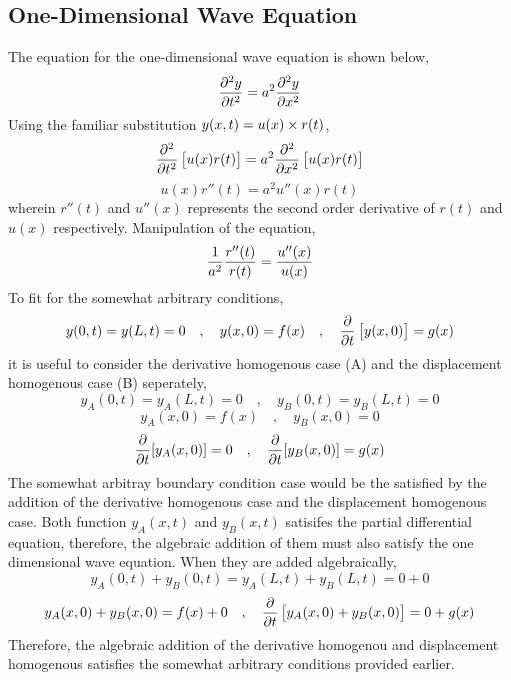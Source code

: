 \documentclass[class=report, 12pt, crop=false]{standalone}
\begin{document}
\begin{center}
\chapter{One-Dimensional Wave Equation}
\begin{comment} 
Physics Archives
\end{comment}
The equation for the one-dimensional wave equation is shown below,
$$\frac{\partial^2 y}{\partial t^2} = a^2\frac{\partial^2 y}{\partial x^2}$$ 
Using the familiar substitution $\displaystyle{y(x,t) = u(x)\times r(t)}$,
$$\frac{\partial^2}{\partial t^2}\left[u(x)r(t)\right] = a^2\frac{\partial^2}{\partial x^2}\left[u(x)r(t)\right]$$
$$u(x)r''(t) = a^2u''(x)r(t)$$ 
wherein $r''(t)$ and $u''(x)$ represents the second order derivative of $r(t)$ and $u(x)$ respectively. Manipulation of the equation,
$$\frac{1}{a^2}\frac{r''(t)}{r(t)} = \frac{u''(x)}{u(x)}$$
To fit for the somewhat arbitrary conditions,
$$y(0,t) = y(L,t) = 0\quad,\quad y(x,0) = f(x) \quad,\quad \frac{\partial}{\partial t}\left[y(x,0)\right] = g(x)$$
it is useful to consider the derivative homogenous case (A) and the displacement homogenous case (B) seperately,
$$y_A(0,t) = y_A(L,t) = 0\quad,\quad y_B(0,t) = y_B(L,t) = 0$$
$$y_A(x,0) = f(x)\quad,\quad y_B(x,0) = 0$$
$$\frac{\partial }{\partial t}[y_A(x,0)] = 0\quad,\quad \frac{\partial }{\partial t}[y_B(x,0)] = g(x)$$
The somewhat arbitray boundary condition case would be the satisfied by the  addition of the derivative homogenous case  and the displacement homogenous case. Both function $y_A(x,t)$ and $y_B(x,t)$ satisifes the partial differential equation, therefore, the algebraic addition of them must also satisfy the one dimensional wave equation. When they are added algebraically,
$$y_A(0,t) + y_B(0,t) = y_A(L,t) + y_B(L,t) = 0 + 0$$
$$y_A(x,0) + y_B(x,0) = f(x) + 0\quad,\quad \frac{\partial}{\partial t}\left[y_A(x,0) + y_B(x,0)\right] = 0 + g(x)$$
Therefore, the algebraic addition of the derivative homogenou and displacement homogenous satisfies the somewhat arbitrary conditions provided earlier.

\end{center}
\end{document}
